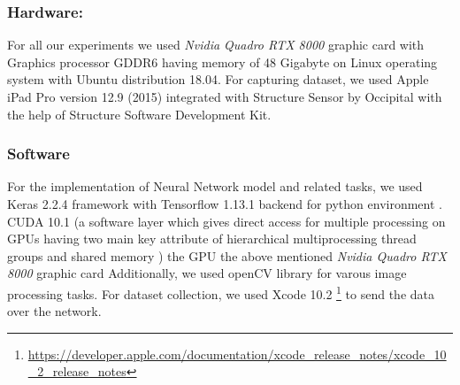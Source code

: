  
\subsubsection{Hardware:} 
\label{Chapter4:Hardware_i}
For all our experiments we used \textit{Nvidia Quadro RTX 8000} graphic card with Graphics processor GDDR6  having memory of 48 Gigabyte on Linux operating system with Ubuntu distribution 18.04. For capturing dataset, we used Apple iPad Pro version 12.9 (2015) integrated with Structure Sensor by Occipital with the help of Structure Software Development Kit.


\subsubsection{Software} 
\label{Chapter4:Software_i}
For the implementation of Neural Network model and related tasks, we used Keras 2.2.4 framework with Tensorflow 1.13.1  backend for python environment \cite{tensorflow2015-whitepaper}. CUDA 10.1 (a software layer which gives direct access for multiple processing on GPUs having two main key attribute of hierarchical multiprocessing thread groups and shared memory \cite{nickolls2008scalable}) the GPU  the above mentioned  \textit{Nvidia Quadro RTX 8000} graphic card  Additionally, we used openCV library \cite{opencv_library} for varous image processing tasks. For dataset collection, we used Xcode 10.2 \footnote{\url{https://developer.apple.com/documentation/xcode_release_notes/xcode_10_2_release_notes}} to send the data over the network.



\newpage



